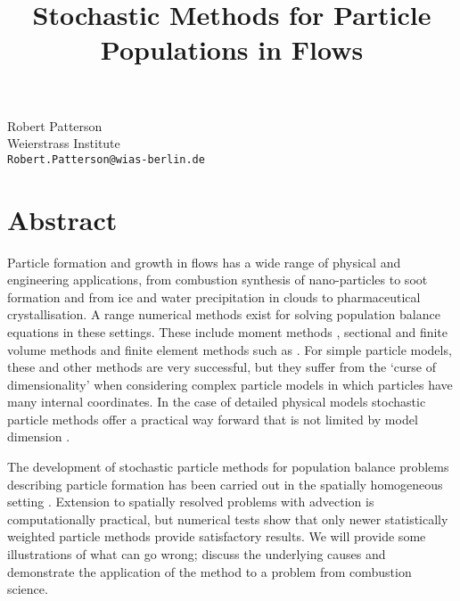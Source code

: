 \title{Stochastic Methods for Particle Populations in Flows}
 \author{} \institute{}
\maketitle
\begin{center}
{\large Robert Patterson}\\
Weierstrass Institute\\
{\tt Robert.Patterson@wias-berlin.de}

\end{center}

\section*{Abstract}

Particle formation and growth in flows has a wide range of physical and
engineering applications, from combustion synthesis of nano-particles
to soot formation and from ice and water precipitation in clouds to
pharmaceutical crystallisation.  A range numerical methods
exist for solving population balance equations in these settings.
These include moment methods \cite{Frenklach,Marchisio}, sectional
and finite volume
methods \cite{Kumar} and finite element methods such as \cite{John}.
For simple particle models, these and other methods are very successful,
but they suffer from the `curse of dimensionality' when considering
complex particle models in which particles have many internal coordinates.
In the case of detailed physical models stochastic particle methods
offer a practical way forward that is not limited by model dimension
\cite{Sander}.

The development of stochastic particle methods for population balance
problems describing particle formation has been carried out in the
spatially homogeneous setting \cite{Wagner}.  Extension to spatially
resolved problems with advection is computationally practical, but
numerical tests show that only newer statistically weighted particle
methods \cite{Pat11} provide satisfactory results.  We will provide
some illustrations of what can go wrong; discuss the underlying causes
and demonstrate the application of the method to a problem from
combustion science.

